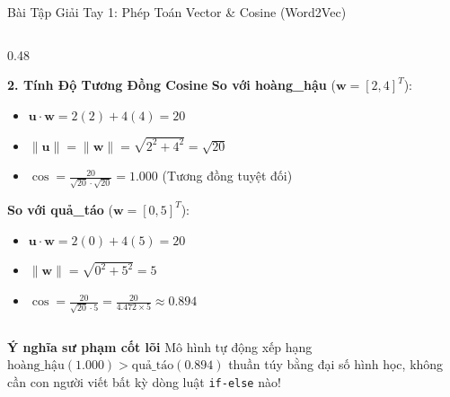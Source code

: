 \documentclass[aspectratio=169, 10pt]{beamer}
\begin{document}
\begin{frame}{Bài Tập Giải Tay 1: Phép Toán Vector \& Cosine (Word2Vec)}
\begin{columns}[T, onlytextwidth]
\begin{column}{0.48\textwidth}
\begin{exampleblock}{\small\textbf{2. Tính Độ Tương Đồng Cosine}}
        \textbf{So với hoàng\_hậu} ($\mathbf{w} = [2, 4]^T$):
        \begin{itemize}\setlength{\itemsep}{0.04em}
          \item $\mathbf{u} \cdot \mathbf{w} = 2(2) + 4(4) = 20$
          \item $\|\mathbf{u}\| = \|\mathbf{w}\| = \sqrt{2^2 + 4^2} = \sqrt{20}$
          \item $\cos = \frac{20}{\sqrt{20}\cdot\sqrt{20}} = \mathbf{1.000}$ (Tương đồng tuyệt đối)
        \end{itemize}
        \vspace{0.02cm}
        \textbf{So với quả\_táo} ($\mathbf{w} = [0, 5]^T$):
        \begin{itemize}\setlength{\itemsep}{0.04em}
          \item $\mathbf{u} \cdot \mathbf{w} = 2(0) + 4(5) = 20$
          \item $\|\mathbf{w}\| = \sqrt{0^2 + 5^2} = 5$
          \item $\cos = \frac{20}{\sqrt{20}\cdot 5} = \frac{20}{4.472 \times 5} \approx \mathbf{0.894}$
        \end{itemize}
      \end{exampleblock}
    \end{column}
  \end{columns}
  \vspace{0.04cm}
  \begin{alertblock}{\small\textbf{Ý nghĩa sư phạm cốt lõi}}
    \centering\fontsize{7}{8.8}\selectfont
    Mô hình tự động xếp hạng $\text{hoàng\_hậu} (1.000) > \text{quả\_táo} (0.894)$ thuần túy bằng đại số hình học, không cần con người viết bất kỳ dòng luật \texttt{if-else} nào!
  \end{alertblock}
\end{frame}
\end{document}
